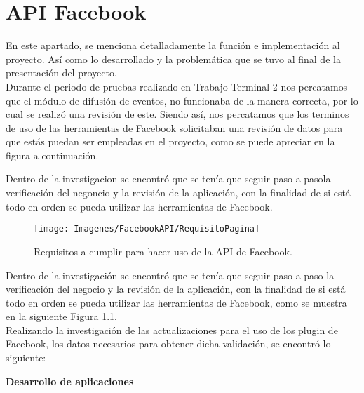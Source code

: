 	\chapter{API Facebook}
	\label{apiFB}
	\noindent En este apartado, se menciona detalladamente la función e implementación al proyecto. Así como lo desarrollado y la problemática que se tuvo al final de la presentación del proyecto.\\
		
	\noindent Durante el periodo de pruebas realizado en Trabajo Terminal 2 nos percatamos que el módulo de difusión de eventos, no funcionaba de la manera correcta, por lo cual se realizó una revisión de este. Siendo así, nos percatamos que los terminos de uso de las herramientas de Facebook solicitaban una revisión de datos para que estás puedan ser empleadas en el proyecto, como se puede apreciar en la figura a continuación.
	
	Dentro de la investigacion se encontró que se  tenía que seguir paso a pasola verificación del negoncio y la revisión de la aplicación, con la finalidad de si está todo en orden se pueda utilizar las herramientas de Facebook.
	
	\begin{figure}[hbt!]
		\centering
		\texttt{[image: Imagenes/FacebookAPI/RequisitoPagina]}
		\caption{Requisitos a cumplir para hacer uso de la API de Facebook.}
		\label{requisitosfb}
	\end{figure}
	
	\noindent Dentro de la investigación se encontró que se tenía que seguir paso a paso la
	verificación del negocio y la revisión de la aplicación, con la finalidad de si está todo en orden se
	pueda utilizar las herramientas de Facebook, como se muestra en la siguiente Figura \ref{requisitosfb}. \\
	
	\noindent Realizando la investigación de las actualizaciones para el uso de los plugin de Facebook,
	los datos necesarios para obtener dicha validación, se encontró lo siguiente: \\
	\pagebreak
	
	\textbf{Desarrollo de aplicaciones} \\
	
